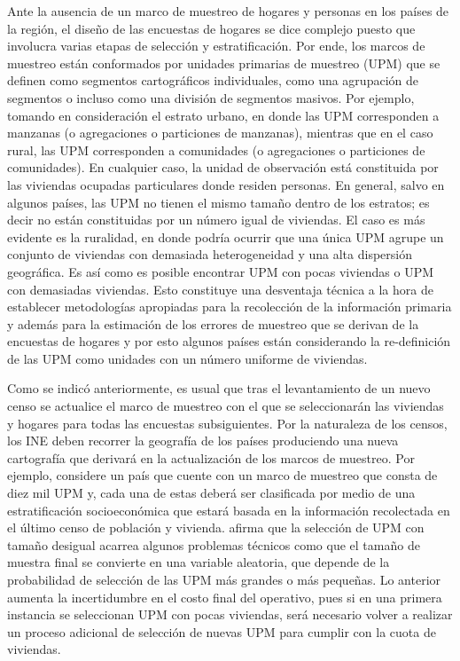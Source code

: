 \documentclass[
  12pt,
  spanish,
]{book}
\begin{document}
Ante la ausencia de un marco de muestreo de hogares y personas en los países de la región, el diseño de las encuestas de hogares se dice complejo puesto que involucra varias etapas de selección y estratificación. Por ende, los marcos de muestreo están conformados por unidades primarias de muestreo (UPM) que se definen como segmentos cartográficos individuales, como una agrupación de segmentos o incluso como una división de segmentos masivos. Por ejemplo, tomando en consideración el estrato urbano, en donde las UPM corresponden a manzanas (o agregaciones o particiones de manzanas), mientras que en el caso rural, las UPM corresponden a comunidades (o agregaciones o particiones de comunidades). En cualquier caso, la unidad de observación está constituida por las viviendas ocupadas particulares donde residen personas. En general, salvo en algunos países, las UPM no tienen el mismo tamaño dentro de los estratos; es decir no están constituidas por un número igual de viviendas. El caso es más evidente es la ruralidad, en donde podría ocurrir que una única UPM agrupe un conjunto de viviendas con demasiada heterogeneidad y una alta dispersión geográfica. Es así como es posible encontrar UPM con pocas viviendas o UPM con demasiadas viviendas. Esto constituye una desventaja técnica a la hora de establecer metodologías apropiadas para la recolección de la información primaria y además para la estimación de los errores de muestreo que se derivan de la encuestas de hogares y por esto algunos países están considerando la re-definición de las UPM como unidades con un número uniforme de viviendas.

Como se indicó anteriormente, es usual que tras el levantamiento de un nuevo censo se actualice el marco de muestreo con el que se seleccionarán las viviendas y hogares para todas las encuestas subsiguientes. Por la naturaleza de los censos, los INE deben recorrer la geografía de los países produciendo una nueva cartografía que derivará en la actualización de los marcos de muestreo. Por ejemplo, considere un país que cuente con un marco de muestreo que consta de diez mil UPM y, cada una de estas deberá ser clasificada por medio de una estratificación socioeconómica que estará basada en la información recolectada en el último censo de población y vivienda. \citet[pág. 183]{Kish_1965} afirma que la selección de UPM con tamaño desigual acarrea algunos problemas técnicos como que el tamaño de muestra final se convierte en una variable aleatoria, que depende de la probabilidad de selección de las UPM más grandes o más pequeñas. Lo anterior aumenta la incertidumbre en el costo final del operativo, pues si en una primera instancia se seleccionan UPM con pocas viviendas, será necesario volver a realizar un proceso adicional de selección de nuevas UPM para cumplir con la cuota de viviendas.
\end{document}
